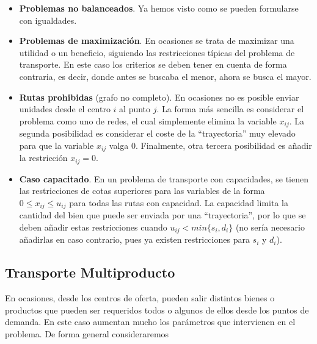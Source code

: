 \begin{itemize}
    \item \textbf{Problemas no balanceados}. Ya hemos visto como se pueden formularse con igualdades.
    \item \textbf{Problemas de maximización}. En ocasiones se trata de maximizar una utilidad o un beneficio, siguiendo
          las restricciones típicas del problema de transporte. En este caso los criterios se deben tener en cuenta de 
          forma contraria, es decir, donde antes se buscaba el menor, ahora se busca el mayor.
    \item \textbf{Rutas prohibidas} (grafo no completo). En ocasiones no es posible enviar unidades desde el centro $i$
          al punto $j$. La forma más sencilla es considerar el problema como uno de redes, el cual simplemente elimina
          la variable $x_{ij}$. La segunda posibilidad es considerar el coste de la ``trayectoria'' muy elevado para que la
          variable $x_{ij}$ valga 0. Finalmente, otra tercera posibilidad es añadir la restricción  $x_{ij}=0$.
          \item \textbf{Caso capacitado}. En un problema de transporte con capacidades, se tienen las restricciones de cotas
          superiores para las variables de la forma $0\leq x_{ij}\leq u_{ij}$ para todas las rutas con capacidad. La 
          capacidad limita la cantidad del bien que puede ser enviada por una ``trayectoria'', por lo que se deben añadir
          estas restricciones cuando $u_{ij}<min\{s_i, d_i\}$ (no sería necesario añadirlas en caso contrario, pues ya 
          existen restricciones para $s_i$ y $d_i$).
\end{itemize}

\newpage

\subsection{Transporte Multiproducto}

En ocasiones, desde los centros de oferta, pueden salir distintos bienes o productos que pueden ser requeridos todos o algunos
de ellos desde los puntos de demanda. En este caso aumentan mucho los parámetros que intervienen en el problema. De forma
general consideraremos

